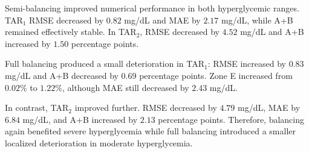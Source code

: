 \begin{table}[htbp]
    \centering
    \caption{Aggregate T1DiabetesGranada performance in the
    hyperglycemic ranges, averaged across balancing methods.}
    \label{tab:t1diabetesgranada_hyperglycemia}
\end{table}

Semi-balancing improved numerical performance in both hyperglycemic ranges. TAR$_1$ RMSE decreased by \(0.82\) mg/dL and MAE by \(2.17\) mg/dL, while A+B remained effectively stable. In TAR$_2$, RMSE decreased by \(4.52\) mg/dL and A+B increased by \(1.50\) percentage points.

Full balancing produced a small deterioration in TAR$_1$: RMSE increased by \(0.83\) mg/dL and A+B decreased by \(0.69\) percentage points. Zone E increased from \(0.02\%\) to \(1.22\%\), although MAE still decreased by \(2.43\) mg/dL.

In contrast, TAR$_2$ improved further. RMSE decreased by \(4.79\) mg/dL, MAE by \(6.84\) mg/dL, and A+B increased by \(2.13\) percentage points. Therefore, balancing again benefited severe hyperglycemia while full balancing introduced a smaller localized deterioration in moderate hyperglycemia.

